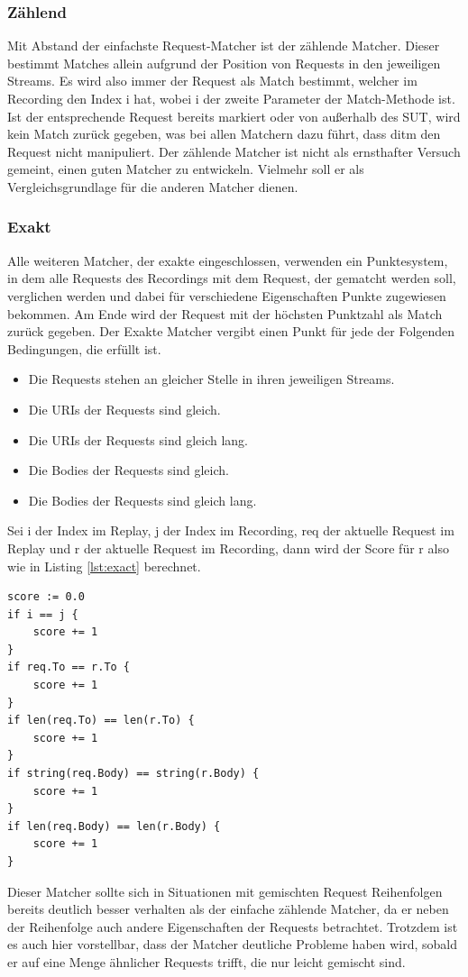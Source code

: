 \documentclass[12pt,a4paper]{report}
\begin{document}
\subsubsection{Zählend}
Mit Abstand der einfachste Request-Matcher ist der zählende Matcher. Dieser bestimmt Matches allein aufgrund der Position
von Requests in den jeweiligen Streams. Es wird also immer der Request als Match bestimmt, welcher im Recording den Index i hat,
wobei i der zweite Parameter der Match-Methode ist. Ist der entsprechende Request bereits markiert oder von außerhalb des SUT,
wird kein Match zurück gegeben, was bei allen Matchern dazu führt, dass ditm den Request nicht manipuliert.
Der zählende Matcher ist nicht als ernsthafter Versuch gemeint, einen guten Matcher zu entwickeln. Vielmehr soll
er als Vergleichsgrundlage für die anderen Matcher dienen.

\subsubsection{Exakt}
Alle weiteren Matcher, der exakte eingeschlossen, verwenden ein Punktesystem, in dem alle Requests des Recordings mit dem Request,
der gematcht werden soll, verglichen werden und dabei für verschiedene Eigenschaften Punkte zugewiesen bekommen. Am Ende wird der
Request mit der höchsten Punktzahl als Match zurück gegeben. Der Exakte Matcher vergibt einen Punkt für jede der Folgenden
Bedingungen, die erfüllt ist.
\begin{itemize}
	\item Die Requests stehen an gleicher Stelle in ihren jeweiligen Streams.
	\item Die URIs der Requests sind gleich.
	\item Die URIs der Requests sind gleich lang.
	\item Die Bodies der Requests sind gleich.
	\item Die Bodies der Requests sind gleich lang.
\end{itemize}
Sei i der Index im Replay, j der Index im Recording, req der aktuelle Request im Replay und r der aktuelle
Request im Recording, dann wird der Score für r also wie in Listing \ref{lst:exact} berechnet.
\begin{lstlisting}[caption={Scoring Code für den Exakten Matcher}, label={lst:exact}]
score := 0.0
if i == j {
    score += 1
}
if req.To == r.To {
    score += 1
}
if len(req.To) == len(r.To) {
    score += 1
}
if string(req.Body) == string(r.Body) {
    score += 1
}
if len(req.Body) == len(r.Body) {
    score += 1
}
\end{lstlisting}
Dieser Matcher sollte sich in Situationen mit gemischten Request Reihenfolgen bereits deutlich besser verhalten als der
einfache zählende Matcher, da er neben der Reihenfolge auch andere Eigenschaften der Requests betrachtet. Trotzdem ist es auch
hier vorstellbar, dass der Matcher deutliche Probleme haben wird, sobald er auf eine Menge ähnlicher Requests trifft, die nur
leicht gemischt sind.
\end{document}

